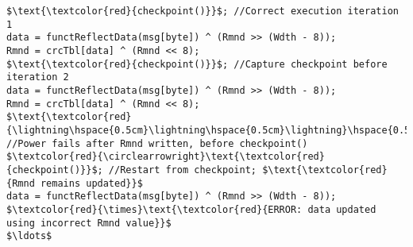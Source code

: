 \documentclass[border={20pt 5pt 15pt 10pt}]{standalone} %
\begin{document}
	

\begin{lstlisting}[style = mystyle]
$\text{\textcolor{red}{checkpoint()}}$; //Correct execution iteration 1 
data = functReflectData(msg[byte]) ^ (Rmnd >> (Wdth - 8));
Rmnd = crcTbl[data] ^ (Rmnd << 8);
$\text{\textcolor{red}{checkpoint()}}$; //Capture checkpoint before iteration 2
data = functReflectData(msg[byte]) ^ (Rmnd >> (Wdth - 8));
Rmnd = crcTbl[data] ^ (Rmnd << 8);      
$\text{\textcolor{red}{\lightning\hspace{0.5cm}\lightning\hspace{0.5cm}\lightning}\hspace{0.5cm}}$ //Power fails after Rmnd written, before checkpoint()
$\textcolor{red}{\circlearrowright}\text{\textcolor{red}{checkpoint()}}$; //Restart from checkpoint; $\text{\textcolor{red}{Rmnd remains updated}}$
data = functReflectData(msg[byte]) ^ (Rmnd >> (Wdth - 8)); 
$\textcolor{red}{\times}\text{\textcolor{red}{ERROR: data updated using incorrect Rmnd value}}$
$\ldots$
\end{lstlisting} 
\end{document}
